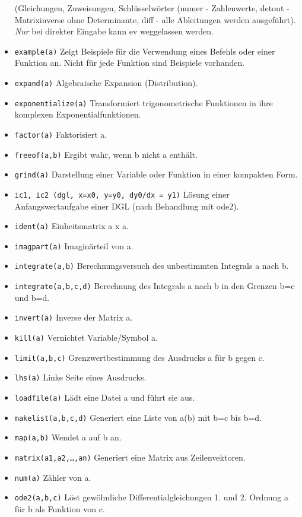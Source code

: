 \documentclass[12pt]{scrartcl}
\begin{document}
\begin{itemize}
  (Gleichungen, Zuweisungen, Schlüsselwörter (numer - Zahlenwerte,
  detout - Matrixinverse ohne Determinante, diff - alle Ableitungen
  werden ausgeführt). \emph{Nur} bei  direkter Eingabe kann ev weggelassen werden.
\item \texttt{example(a)} Zeigt Beispiele für die Verwendung eines
  Befehls oder einer  Funktion an. Nicht für jede Funktion sind Beispiele vorhanden.
\item \texttt{expand(a)} Algebraische Expansion (Distribution).
\item \texttt{exponentialize(a)} Transformiert trigonometrische Funktionen in ihre komplexen Exponentialfunktionen.
\item \texttt{factor(a)} Faktorisiert a.
\item \texttt{freeof(a,b)} Ergibt wahr, wenn b nicht a enthält.
\item \texttt{grind(a)} Darstellung einer Variable oder Funktion in einer kompakten Form.
\item \texttt{ic1, ic2 (dgl, x=x0, y=y0, dy0/dx = y1)} Lösung einer Anfangswertaufgabe einer DGL (nach Behandlung mit ode2).
\item \texttt{ident(a)} Einheitsmatrix a x a.
\item \texttt{imagpart(a)} Imaginärteil von a.
\item \texttt{integrate(a,b)} Berechnungsversuch des unbestimmten Integrals a nach b.
\item \texttt{integrate(a,b,c,d)} Berechnung des Integrals a nach b in den Grenzen b=c und b=d.
\item \texttt{invert(a)} Inverse der Matrix a.
\item \texttt{kill(a)} Vernichtet Variable/Symbol a.
\item \texttt{limit(a,b,c)} Grenzwertbestimmung des Ausdrucks a für b gegen c.
\item \texttt{lhs(a)} Linke Seite eines Ausdrucks.
\item \texttt{loadfile(a)} Lädt eine Datei a und führt sie aus.
\item \texttt{makelist(a,b,c,d)} Generiert eine Liste von a(b) mit  b=c
  bis  b=d.
\item \texttt{map(a,b)} Wendet a auf b an.
\item \texttt{matrix(a1,a2,\ldots,an)} Generiert eine Matrix aus  Zeilenvektoren.
\item \texttt{num(a)} Zähler von a.
\item \texttt{ode2(a,b,c)} Löst gewöhnliche Differentialgleichungen 1.
  und  2. Ordnung a für b als Funktion von c.

\end{itemize}
\end{document}
